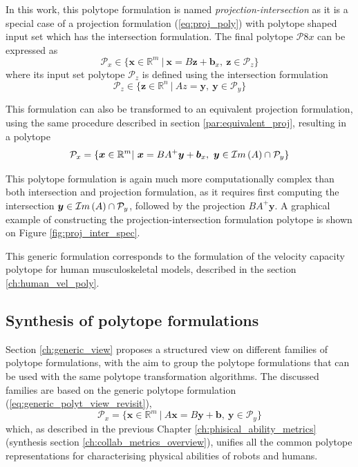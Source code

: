 In this work, this polytope formulation is named \textit{projection-intersection} as it is a special case of a projection formulation (\ref{eq:proj_poly}) with polytope shaped input set which has the intersection formulation. The final polytope $\mathcal{P}8x$ can be expressed as
\begin{equation}
    \mathcal{P}_x \in \{\bm{x}\in \mathbb{R}^m~|~ \bm{x} = B\bm{z} + \bm{b}_x,~ \bm{z} \in \mathcal{P}_z\} 
\end{equation}
where its input set polytope $\mathcal{P}_z$ is defined using the intersection formulation
\begin{equation}
    \mathcal{P}_z \in \{\bm{z}\in \mathbb{R}^n~|~Az = \bm{y},~ \bm{y} \in \mathcal{P}_y\} 
\end{equation}

This formulation can also be transformed to an equivalent projection formulation, using the same procedure described in section \ref{par:equivalent_proj}, resulting in a polytope 
\begin{equation}
\mathcal{P}_x=\{\bm{x} \in \mathbb{R}^m |~ \bm{x} = BA^+\bm{y} + \bm{b}_x,~ \bm{y}\in \mathcal{I}m\left(A\right)\cap\mathcal{P}_y\} 
\end{equation}

This polytope formulation is again much more computationally complex than both intersection and projection formulation, as it requires first computing the intersection $\bm{y} \in \mathcal{I}m\left(A\right)\cap\mathcal{P}_y$, followed by the projection $BA^{+}\bm{y}$. A graphical example of constructing the projection-intersection formulation polytope is shown on Figure \ref{fig:proj_inter_spec}.

\begin{remark}
    This generic formulation corresponds to the formulation of the velocity capacity polytope for human musculoskeletal models, described in the section \ref{ch:human_vel_poly}.
\end{remark}


\subsection{Synthesis of polytope formulations}
\label{ch:which_metric_which_formulation}

Section \ref{ch:generic_view} proposes a structured view on different families of polytope formulations, with the aim to group the polytope formulations that can be used with the same polytope transformation algorithms. The discussed families are based on the generic polytope formulation (\ref{eq:generic_polyt_view_revisit}), 
\begin{equation}
    \mathcal{P}_x = \{\bm{x}\in\mathbb{R}^m ~|~ A\bm{x}=B\bm{y} + \bm{b}, ~ \bm{y}\in\mathcal{P}_y\}
    \label{eq:generic_polyt_view_revisit2}
\end{equation}
which, as described in the previous Chapter \ref{ch:phisical_ability_metrics} (synthesis section \ref{ch:collab_metrics_overview}), unifies all the common polytope representations for characterising physical abilities of robots and humans. 

